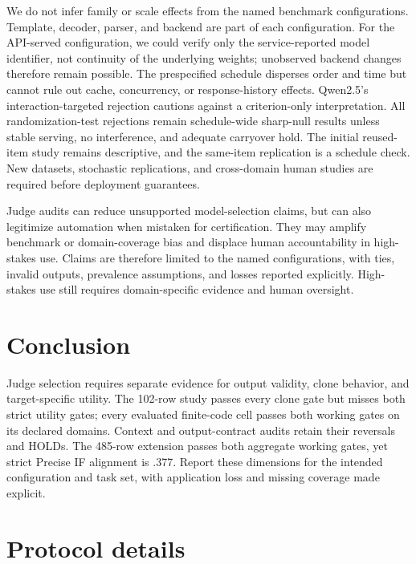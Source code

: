 \documentclass[10pt]{article}
\begin{document}
We do not infer family or scale effects from the named benchmark configurations. Template, decoder, parser, and backend are part of each configuration. For the API-served configuration, we could verify only the service-reported model identifier, not continuity of the underlying weights; unobserved backend changes therefore remain possible. The prespecified schedule disperses order and time but cannot rule out cache, concurrency, or response-history effects. Qwen2.5's interaction-targeted rejection cautions against a criterion-only interpretation. All randomization-test rejections remain schedule-wide sharp-null results unless stable serving, no interference, and adequate carryover hold. The initial reused-item study remains descriptive, and the same-item replication is a schedule check. New datasets, stochastic replications, and cross-domain human studies are required before deployment guarantees.

Judge audits can reduce unsupported model-selection claims, but can also legitimize automation when mistaken for certification. They may amplify benchmark or domain-coverage bias and displace human accountability in high-stakes use. Claims are therefore limited to the named configurations, with ties, invalid outputs, prevalence assumptions, and losses reported explicitly. High-stakes use still requires domain-specific evidence and human oversight.

\section{Conclusion}

Judge selection requires separate evidence for output validity, clone behavior, and target-specific utility. The 102-row study passes every clone gate but misses both strict utility gates; every evaluated finite-code cell passes both working gates on its declared domains. Context and output-contract audits retain their reversals and HOLDs. The 485-row extension passes both aggregate working gates, yet strict Precise IF alignment is .377. Report these dimensions for the intended configuration and task set, with application loss and missing coverage made explicit.

\clearpage



\clearpage
\appendix
\section{Protocol details}
\end{document}
